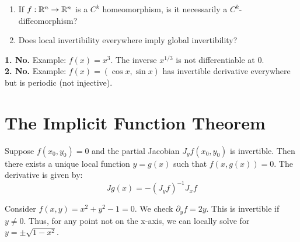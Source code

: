 \begin{question*}
\begin{enumerate}
    \item If $f: \mathbb{R}^n \to \mathbb{R}^n$ is a $C^k$ homeomorphism, is it necessarily a $C^k$-diffeomorphism?
    \item Does local invertibility everywhere imply global invertibility?
\end{enumerate}
\end{question*}

\begin{answer*}
\textbf{1. No.} Example: $f(x) = x^3$. The inverse $x^{1/3}$ is not differentiable at 0. \\
\textbf{2. No.} Example: $f(x) = (\cos x, \sin x)$ has invertible derivative everywhere but is periodic (not injective).
\end{answer*}

\hrulefill

\section{The Implicit Function Theorem}

\begin{theorem*}
Suppose $f(x_0, y_0) = 0$ and the partial Jacobian $J_y f(x_0, y_0)$ is invertible. Then there exists a unique local function $y = g(x)$ such that $f(x, g(x)) = 0$.
The derivative is given by:
\[ Jg(x) = -(J_y f)^{-1} J_x f \]
\end{theorem*}


\begin{example*}
Consider $f(x,y) = x^2 + y^2 - 1 = 0$. We check $\partial_y f = 2y$.
This is invertible if $y \ne 0$. Thus, for any point not on the x-axis, we can locally solve for $y = \pm\sqrt{1-x^2}$.

\begin{center}
\end{center}
\end{example*}


